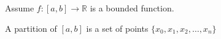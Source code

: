 Assume \(f:[a,b] \to \mathbb{R}\) is a bounded function.
\begin{definition}
A partition of \([a,b]\) is a set of points \(\{x_0, x_1, x_2, \dots, x_n\}\)
\end{definition}
